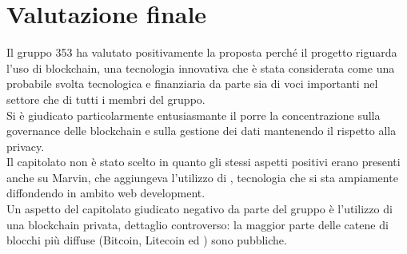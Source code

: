 \documentclass[StudioDiFattibilità.tex]{subfiles}
\begin{document}
\section{Valutazione finale}
Il gruppo 353 ha valutato positivamente la proposta perché il progetto riguarda l'uso di blockchain, una tecnologia innovativa che è stata considerata come una probabile svolta tecnologica e finanziaria da parte sia di voci importanti nel settore che di tutti i membri del gruppo.\\
Si è giudicato particolarmente entusiasmante il porre la concentrazione sulla governance delle blockchain e sulla gestione dei dati mantenendo il rispetto alla privacy.\\
Il capitolato non è stato scelto in quanto gli stessi aspetti positivi erano presenti anche su Marvin, che aggiungeva l'utilizzo di , tecnologia che si sta ampiamente diffondendo in ambito web development.\\
Un aspetto del capitolato giudicato negativo da parte del gruppo è l'utilizzo di una blockchain privata, dettaglio controverso: la maggior parte delle catene di blocchi più diffuse (Bitcoin, Litecoin ed ) sono pubbliche.
\end{document}

